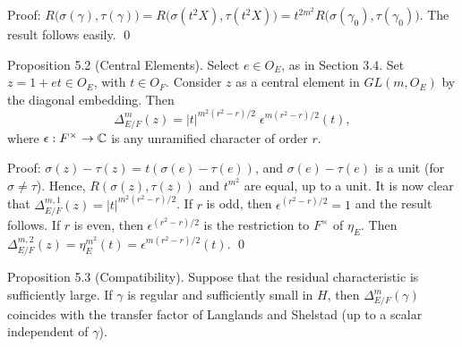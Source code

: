 \documentclass{amsart}
\begin{document}
\pproclaim Proof:
$  R 
  \bigl(
    \sigma (\gamma),\tau (\gamma) 
  \bigr)
=
  R 
  \bigl( 
    \sigma (t^2 X), \tau (t^2 X)
  \bigr) 
=
  t^{2m^2} R
  \bigl(
    \sigma (\gamma_0), \tau (\gamma_0)
  \bigr)
$.
%
The result follows easily.
\qed
\finishpproclaim

\bigskip
\proclaim Proposition {5.2} (Central Elements).
Select 
  $ e \in O_E $, as in Section 3.4.
Set
  $ z = 1 + e t\in O_E$, with $t\in O_F$.
Consider $z$ as a central element in 
  $ GL(m, O_E) $
by the diagonal embedding.
Then 
%
$$
  \Delta_{E/F}^m (z) =
  |t|^{ m^2 (r^2-r)/2 } \;
  \epsilon^{ m (r^2-r)/2 }(t),
$$
%
where
  $ \epsilon: F^{\times} \to {\Bbb C} $
is any unramified character 
of order $r$.
\finishproclaim

\pproclaim Proof:
  $\sigma (z)- \tau (z) = t (\sigma(e)-\tau(e))$,
  and $\sigma(e)-\tau(e)$ is a unit (for $\sigma\ne\tau$).
Hence,
$R(\sigma(z),\tau(z))$ and $t^{m^2}$ are equal, up
to a unit.
%
It is now clear that
  $ \Delta_{E/F}^{m,1} (z) =
    | t|^{ m^2 (r^2-r)/2 } $.
If $r$ is odd, then
  $ \epsilon^{(r^2-r)/2} = 1 $
and the result follows.
If $r$ is even, then
  $ \epsilon^{(r^2-r)/2} $
is the restriction to
  $ F^{\times} $ 
of
  $ \eta_E $.
Then
  $ \Delta_{E/F}^{m,2} (z) =
    \eta_E^{m^2} (t) =
    \epsilon^{ m (r^2-r)/2 } (t) $.
\qed
\finishpproclaim 



\bigskip
\proclaim Proposition {5.3} (Compatibility).
Suppose that the residual characteristic is sufficiently large.
If $ \gamma $ is regular and sufficiently small in
  $ H$, then 
$\Delta^m_{E/F}(\gamma)$ coincides with the transfer factor of Langlands
and Shelstad (up to a scalar independent of $\gamma$).
\finishproclaim
\end{document}
